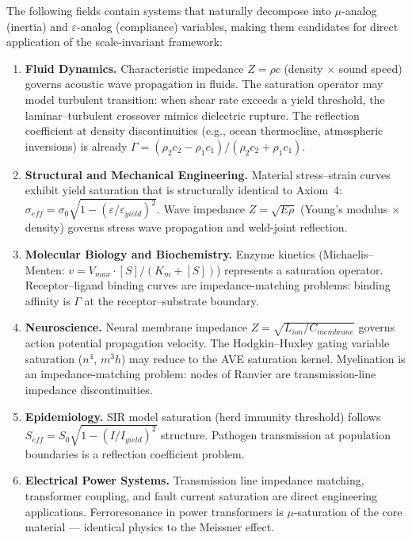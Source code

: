 The following fields contain systems that naturally decompose into
$\mu$-analog (inertia) and $\varepsilon$-analog (compliance)
variables, making them candidates for direct application of the
scale-invariant framework:

\begin{enumerate}

\item \textbf{Fluid Dynamics.}
Characteristic impedance $Z = \rho c$ (density $\times$ sound speed)
governs acoustic wave propagation in fluids.  The saturation operator
may model turbulent transition: when shear rate exceeds a yield
threshold, the laminar--turbulent crossover mimics dielectric
rupture.  The reflection coefficient at density discontinuities
(e.g., ocean thermocline, atmospheric inversions) is already
$\Gamma = (\rho_2 c_2 - \rho_1 c_1)/(\rho_2 c_2 + \rho_1 c_1)$.

\item \textbf{Structural and Mechanical Engineering.}
Material stress--strain curves exhibit yield saturation that is
structurally identical to Axiom~4: $\sigma_{eff} = \sigma_0
\sqrt{1 - (\varepsilon/\varepsilon_{yield})^2}$.  Wave impedance
$Z = \sqrt{E \rho}$ (Young's modulus $\times$ density) governs
stress wave propagation and weld-joint reflection.

\item \textbf{Molecular Biology and Biochemistry.}
Enzyme kinetics (Michaelis--Menten: $v = V_{max} \cdot [S]/(K_m +
[S])$) represents a saturation operator.  Receptor--ligand binding
curves are impedance-matching problems: binding affinity is $\Gamma$
at the receptor--substrate boundary.

\item \textbf{Neuroscience.}
Neural membrane impedance $Z = \sqrt{L_{ion}/C_{membrane}}$ governs
action potential propagation velocity.  The Hodgkin--Huxley gating
variable saturation ($n^4$, $m^3 h$) may reduce to the AVE saturation
kernel.  Myelination is an impedance-matching problem: nodes of
Ranvier are transmission-line impedance discontinuities.

\item \textbf{Epidemiology.}
SIR model saturation (herd immunity threshold) follows
$S_{eff} = S_0 \sqrt{1 - (I/I_{yield})^2}$ structure.  Pathogen
transmission at population boundaries is a reflection coefficient
problem.

\item \textbf{Electrical Power Systems.}
Transmission line impedance matching, transformer coupling, and
fault current saturation are direct engineering applications.
Ferroresonance in power transformers is $\mu$-saturation of the
core material --- identical physics to the Meissner effect.


\end{enumerate}
